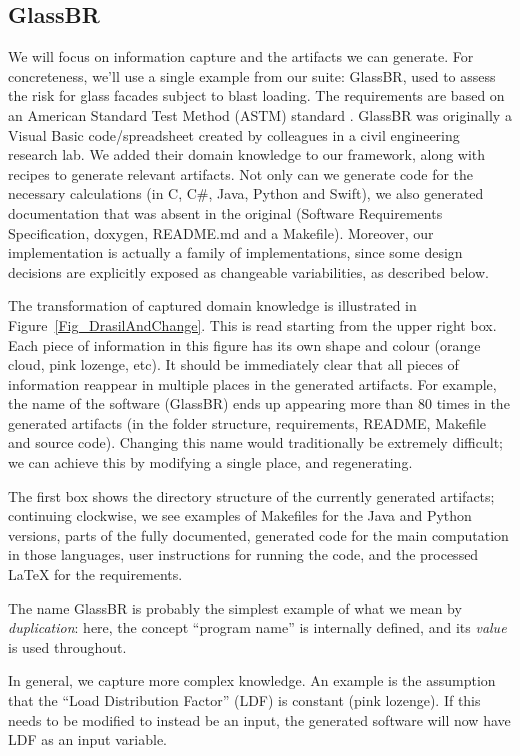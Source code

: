 \documentclass[a4paper,UKenglish,cleveref,autoref,thm-restate]{oasics-v2021}
\newcommand{\CC}{C\nolinebreak\hspace{-.05em}\raisebox{.4ex}{\small\bf +}\nolinebreak\hspace{-.10em}\raisebox{.4ex}{\small\bf +}}
\begin{document}
\subsection{GlassBR}
We will focus on information capture and the artifacts we can generate. For
concreteness, we'll use a single example from our suite: GlassBR, used to assess
the risk for glass facades subject to blast loading. The requirements are based
on an American Standard Test Method (ASTM) standard \cite{ASTM2009, ASTM2015,
BeasonEtAl1998}. GlassBR was originally a Visual Basic code/spreadsheet
created by colleagues in a civil engineering research lab.  We added their
domain knowledge to our framework, along with recipes to generate relevant
artifacts.  Not only can we generate code for the necessary calculations (in
\CC, C\#, Java, Python and Swift), we also generated documentation that was absent in the
original (Software Requirements Specification, doxygen, README.md and a
Makefile). Moreover, our implementation is actually a family of implementations,
since some design decisions are explicitly exposed as changeable variabilities,
as described below.

The transformation of captured domain knowledge is illustrated in
Figure~\ref{Fig_DrasilAndChange}. This is read starting from the upper right
box. Each piece of information in this figure has its own shape and colour
(orange cloud, pink lozenge, etc). It should be immediately clear that all
pieces of information reappear in multiple places in the generated artifacts.
For example, the name of the software (GlassBR) ends up appearing more than 80
times in the generated artifacts (in the folder structure, requirements, README,
Makefile and source code). Changing this name would traditionally be extremely
difficult; we can achieve this by modifying a single place, and regenerating.

The first box shows the directory structure of the currently generated
artifacts; continuing clockwise, we see examples of Makefiles for the Java and
Python versions, parts of the fully documented, generated code for the main
computation in those languages, user instructions for running the code, and the
processed \LaTeX{} for the requirements.

The name GlassBR is probably the simplest example of what we mean by
\emph{duplication}: here, the concept ``program name'' is internally defined, and
its \emph{value} is used throughout. 

In general, we capture more complex knowledge. An example is the assumption
that the ``Load Distribution Factor'' (LDF) is constant (pink lozenge). If this
needs to be modified to instead be an input, the generated software will now
have LDF as an input variable.  
\end{document}
